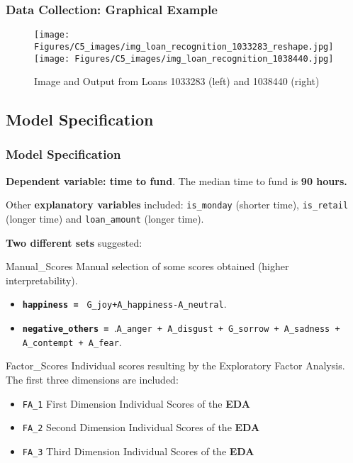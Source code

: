 \documentclass{beamer}
\begin{document}
\begin{frame}[plain]
\frametitle{Data Collection: Graphical Example}
\begin{figure}
\texttt{[image: Figures/C5\_images/img\_loan\_recognition\_1033283\_reshape.jpg]}%
\texttt{[image: Figures/C5\_images/img\_loan\_recognition\_1038440.jpg]}
\caption{Image and Output from Loans 1033283 (left) and 1038440 (right)}
\end{figure}
\end{frame}


\subsection{Model Specification}
\begin{frame}[plain]\frametitle{Model Specification}
\footnotesize{
\textbf{Dependent variable: time to fund}. The median time to fund is \textbf{90 hours.} \par
Other \textbf{explanatory variables} included: \texttt{is\_monday} (shorter time), \texttt{is\_retail} (longer time) and \texttt{loan\_amount} (longer time). \par
\textbf{Two different sets} suggested:

\begin{block}{Manual\_Scores}
Manual selection of some scores obtained (higher interpretability).
\begin{itemize}
\item \textbf{\texttt{happiness = }} \texttt{G\_joy+A\_happiness-A\_neutral}.
\item \textbf{\texttt{negative\_others = }}.\texttt{A\_anger + A\_disgust + G\_sorrow + A\_sadness + A\_contempt + A\_fear}.
\end{itemize}
\end{block}

\begin{block}{Factor\_Scores}
Individual scores resulting by the Exploratory Factor Analysis. The first three dimensions are included:
\begin{itemize}
\item \texttt{FA\_1} First Dimension Individual Scores of the \textbf{EDA}
\item \texttt{FA\_2} Second Dimension Individual Scores of the \textbf{EDA}
\item \texttt{FA\_3} Third Dimension Individual Scores of the \textbf{EDA}
\end{itemize}
\end{block}
}
\end{frame}
\end{document}
